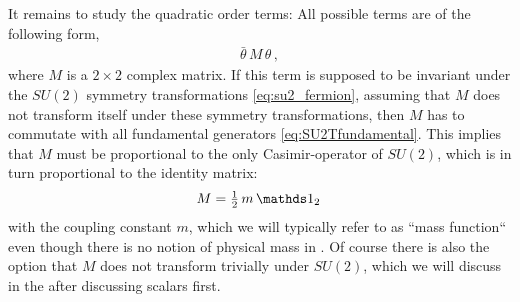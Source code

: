 It remains to study the quadratic order terms: All possible terms are of the following form,
	\begin{align}
		\bar{\theta} \, M \, \theta \, ,	\label{eq:fermion_quadratic_interaction}
	\end{align}
where $M$ is a $2 \times 2$ complex matrix.
If this term is supposed to be invariant under the $SU(2)$ symmetry transformations \eqref{eq:su2_fermion}, assuming that $M$ does not transform itself under these symmetry transformations, then $M$ has to commutate with all fundamental generators \eqref{eq:SU2Tfundamental}. 
This implies that $M$ must be proportional to the only Casimir-operator of $SU(2)$, which is in turn proportional to the identity matrix:
\begin{align}
M =  \tfrac{1}{2}\, m \, \Id_2\,
\label{eq:0dSU2modelmDef}
\end{align}
with the coupling constant $m$, which we will typically refer to as ``mass function`` even though there is no notion of physical mass in \dzero{}.
Of course there is also the option that $M$ does not transform trivially under $SU(2)$, which we will discuss in the  after discussing scalars first.

